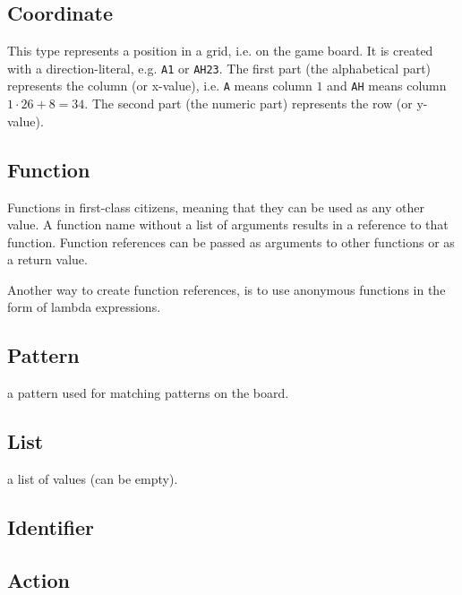 
\subsection{Coordinate}
This type represents a position in a grid, i.e. on the game board. It is created with
a direction-literal, e.g. \texttt{A1} or \texttt{AH23}. The first part (the alphabetical part)
represents the column (or x-value), i.e. \texttt{A} means column $1$ and \texttt{AH} means
column $1 \cdot 26 + 8 = 34$. The second part (the numeric part) represents the row (or y-value).


\subsection{Function}
Functions in \productname{} first-class citizens, meaning that they can be used as any
other value. A function name without a list of arguments results in a reference to that
function. Function references can be passed as arguments to other functions or as a return
value.

Another way to create function references, is to use anonymous functions in the form
of lambda expressions. 
\subsection{Pattern}
a pattern used for matching patterns on the board.
\subsection{List}
a list of values (can be empty).

\subsection{Identifier}

\subsection{Action}


